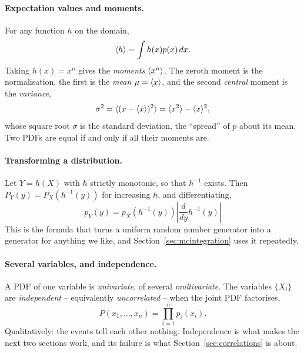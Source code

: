 \paragraph{Expectation values and moments.}
For any function $h$ on the domain,
\begin{equation}
  \langle h \rangle = \int h(x)p(x)\,dx .
  \label{eq:12-expectation}
\end{equation}
Taking $h(x)=x^n$ gives the \emph{moments} $\langle x^n \rangle$.  The zeroth moment is
the normalisation, the first is the \emph{mean} $\mu=\langle x \rangle$, and the second
\emph{central} moment is the \emph{variance},
\begin{equation}
  \sigma^2 = \langle (x-\langle x \rangle)^2 \rangle = \langle x^2 \rangle-\langle x \rangle^2 ,
  \label{eq:12-variance}
\end{equation}
whose square root $\sigma$ is the standard deviation, the ``spread'' of $p$
about its mean.  Two PDFs are equal if and only if all their moments are.

\paragraph{Transforming a distribution.}
Let $Y=h(X)$ with $h$ strictly monotonic, so that $h^{-1}$ exists.  Then
$P_Y(y)=P_X(h^{-1}(y))$ for increasing $h$, and differentiating,
\begin{equation}
  \boxed{\;
  p_Y(y) = p_X\!\left(h^{-1}(y)\right)
    \left|\frac{d}{dy}h^{-1}(y)\right| \;}
  \label{eq:12-transform}
\end{equation}
This is the formula that turns a uniform random number generator into a
generator for anything we like, and Section~\ref{sec:mcintegration} uses it
repeatedly.

\paragraph{Several variables, and independence.}
A PDF of one variable is \emph{univariate}, of several \emph{multivariate}.
The variables $\{X_i\}$ are \emph{independent} -- equivalently
\emph{uncorrelated} -- when the joint PDF factorises,
\begin{equation}
  P(x_1,\dots,x_n) = \prod_{i=1}^{n}p_i(x_i).
  \label{eq:12-independence}
\end{equation}
Qualitatively: the events tell each other nothing.  Independence is what makes
the next two sections work, and its failure is what
Section~\ref{sec:correlations} is about.

